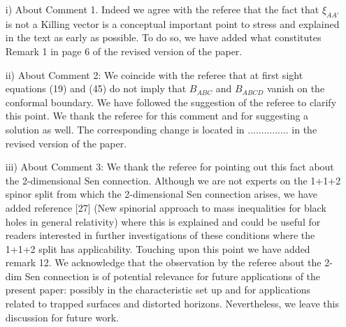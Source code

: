 \documentclass[a4paper,10pt]{article}
\theoremstyle{plain}
\numberwithin{equation}{section}
\begin{document}
  \begin{itemize}

  \item[i)] About Comment 1. Indeed we agree with the referee that the
    fact that $\xi_{AA'}$ is not a Killing vector is a conceptual
    important point to stress and explained in the text as early as
    possible. To do so, we have added what constitutes Remark 1 in
    page 6 of the revised version of the paper.

  
     
  \item[ii)] About Comment 2: We coincide with the referee that at
    first sight equations (19) and (45) do not imply that $B_{ABC}$
    and $B_{ABCD}$ vanish on the conformal boundary. We have followed
    the suggestion of the referee to clarify this point. We thank the
    referee for this comment and for suggesting a solution as
    well. The corresponding change is located in ............... in
    the revised version of the paper.

  \item[iii)] About Comment 3: We thank the referee for pointing out
    this fact about the 2-dimensional Sen connection. Although we are
    not experts on the 1+1+2 spinor split from which the 2-dimensional
    Sen connection arises, we have added reference [27] (New spinorial
    approach to mass inequalities for black holes in general
    relativity) where this is explained and could be useful for
    readers interested in further investigations of these conditions
    where the 1+1+2 split has applicability. Touching upon this point
    we have added remark 12. We acknowledge that the observation by the
    referee about the 2-dim Sen connection is of potential relevance
    for future applications of the present paper: possibly in the
    characteristic set up and for applications related to trapped
    surfaces and distorted horizons. Nevertheless, we leave this
    discussion for future work.

    
  \end{itemize}
\end{document}
